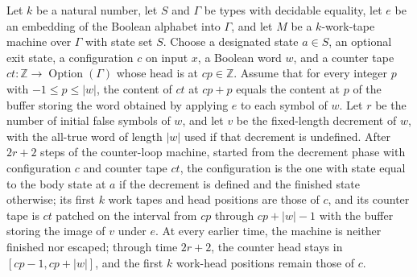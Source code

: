 \begin{lemma}
\label{Turing.counter_debit}
\leanok
{}
Let $k$ be a natural number, let $S$ and $\Gamma$ be types with decidable equality, let
$e$ be an embedding of the Boolean alphabet into $\Gamma$, and let $M$ be a
$k$-work-tape machine over $\Gamma$ with state set $S$. Choose a designated state $a\in
S$, an optional exit state, a configuration $c$ on input $x$, a Boolean word $w$, and a
counter tape $ct:\mathbb{Z}\to\operatorname{Option}(\Gamma)$ whose head is at
$cp\in\mathbb{Z}$. Assume that for every integer $p$ with $-1\le p\le |w|$, the content
of $ct$ at $cp+p$ equals the content at $p$ of the buffer storing the word obtained by
applying $e$ to each symbol of $w$. Let $r$ be the number of initial false symbols of
$w$, and let $v$ be the fixed-length decrement of $w$, with the all-true word of length
$|w|$ used if that decrement is undefined. After $2r+2$ steps of the counter-loop
machine, started from the decrement phase with configuration $c$ and counter tape $ct$,
the configuration is the one with state equal to the body state at $a$ if the decrement
is defined and the finished state otherwise; its first $k$ work tapes and head positions
are those of $c$, and its counter tape is $ct$ patched on the interval from $cp$ through
$cp+|w|-1$ with the buffer storing the image of $v$ under $e$. At every earlier time,
the machine is neither finished nor escaped; through time $2r+2$, the counter head stays
in $[cp-1,cp+|w|]$, and the first $k$ work-head positions remain those of $c$.
\end{lemma}

